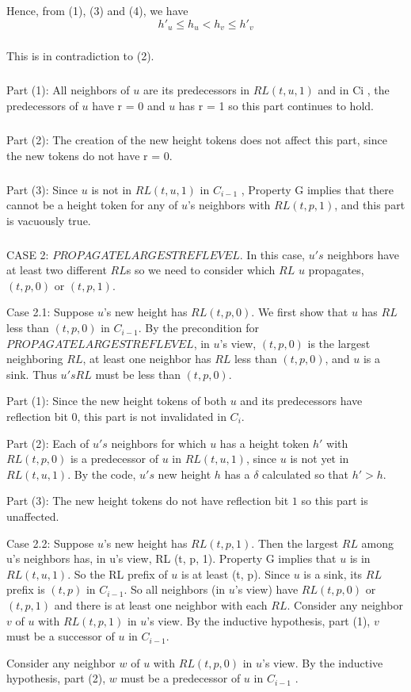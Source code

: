 Hence, from (1), (3) and (4), we have
\begin{equation}
h'_u \leq h_u < h_v \leq h'_v
\end{equation}
\subparagraph{}This is in contradiction to (2).
\subparagraph{}Part (1): All neighbors of $u$ are its predecessors in $RL (t, u, 1)$ and in Ci , the predecessors of $u$ have r = 0 and $u$ has r = 1 so this part continues to hold.
\subparagraph{}Part (2): The creation of the new height tokens does not affect this part, since the new tokens do not have r = 0.
\subparagraph{}Part (3): Since $u$ is not in $RL (t, u, 1)$ in $C_{i-1}$ , Property G implies that there cannot be a height token for any of $u$'s neighbors with $RL (t, p, 1)$, and this part is vacuously true.
\subparagraph{}CASE 2: $PROPAGATELARGESTREFLEVEL$. In this case, $u's$ neighbors have at least two different $RL$s so we need to consider which $RL$ $u$ propagates, $(t, p, 0)$ or $(t, p, 1)$.

Case 2.1: Suppose $u$'s new height has $RL (t, p, 0)$. We first show that $u$ has $RL$ less than $(t, p, 0)$ in $C_{i-1}$. By the precondition for $PROPAGATELARGESTREFLEVEL$, in $u$'s view, $(t, p, 0)$ is the largest neighboring $RL$, at least one neighbor has $RL$ less than $(t, p, 0)$, and $u$ is a sink. Thus $u's RL$ must be less than $(t, p, 0)$.

Part (1): Since the new height tokens of both $u$ and its predecessors have reflection bit $0$, this part is not invalidated in $C_i$.

Part (2): Each of $u's$ neighbors for which $u$ has a height token $h'$ with $RL (t, p, 0)$ is a predecessor of $u$ in $RL (t, u, 1)$, since $u$ is not yet in $RL (t, u, 1)$. By the code, $u's$ new height $h$ has a $\delta$ calculated so that $h' > h$.

Part (3): The new height tokens do not have reflection bit $1$ so this part is unaffected.

Case 2.2: Suppose $u$'s new height has $RL (t, p, 1)$. Then the largest $RL$ among u's neighbors has, in u's view, RL (t, p, 1). Property G implies that $u$ is in $RL (t, u, 1)$. So the RL prefix of $u$ is at least (t, p). Since $u$ is a sink, its $RL$ prefix is $(t, p)$ in $C_{i-1}$. So all neighbors (in $u$'s view) have $RL (t, p, 0)$ or $(t, p, 1)$ and there is at least one neighbor with each $RL$. Consider any neighbor $v$ of $u$ with $RL (t, p, 1)$ in $u$'s view. By the inductive hypothesis, part (1), $v$ must be a successor of $u$ in $C_{i-1}$.

Consider any neighbor $w$ of $u$ with $RL (t, p, 0)$ in $u$'s view. By the inductive hypothesis, part (2), $w$ must be a predecessor of $u$ in $C_{i-1}$ .


